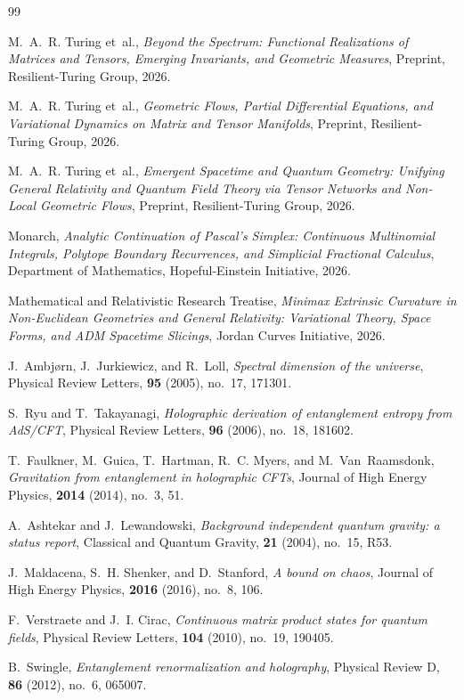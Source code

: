 \documentclass[11pt,a4paper,reqno]{amsart}
\theoremstyle{definition}
\numberwithin{equation}{section}
\begin{document}
\begin{thebibliography}{99}

M.~A.~R. Turing et~al.,
\emph{Beyond the Spectrum: Functional Realizations of Matrices and Tensors, Emerging Invariants, and Geometric Measures},
Preprint, Resilient-Turing Group, 2026.

M.~A.~R. Turing et~al.,
\emph{Geometric Flows, Partial Differential Equations, and Variational Dynamics on Matrix and Tensor Manifolds},
Preprint, Resilient-Turing Group, 2026.

M.~A.~R. Turing et~al.,
\emph{Emergent Spacetime and Quantum Geometry: Unifying General Relativity and Quantum Field Theory via Tensor Networks and Non-Local Geometric Flows},
Preprint, Resilient-Turing Group, 2026.

Monarch,
\emph{Analytic Continuation of Pascal's Simplex: Continuous Multinomial Integrals, Polytope Boundary Recurrences, and Simplicial Fractional Calculus},
Department of Mathematics, Hopeful-Einstein Initiative, 2026.

Mathematical and Relativistic Research Treatise,
\emph{Minimax Extrinsic Curvature in Non-Euclidean Geometries and General Relativity: Variational Theory, Space Forms, and ADM Spacetime Slicings},
Jordan Curves Initiative, 2026.

J.~Ambj{\o}rn, J.~Jurkiewicz, and R.~Loll,
\emph{Spectral dimension of the universe},
Physical Review Letters, \textbf{95} (2005), no.~17, 171301.

S.~Ryu and T.~Takayanagi,
\emph{Holographic derivation of entanglement entropy from AdS/CFT},
Physical Review Letters, \textbf{96} (2006), no.~18, 181602.

T.~Faulkner, M.~Guica, T.~Hartman, R.~C. Myers, and M.~Van~Raamsdonk,
\emph{Gravitation from entanglement in holographic CFTs},
Journal of High Energy Physics, \textbf{2014} (2014), no.~3, 51.

A.~Ashtekar and J.~Lewandowski,
\emph{Background independent quantum gravity: a status report},
Classical and Quantum Gravity, \textbf{21} (2004), no.~15, R53.

J.~Maldacena, S.~H. Shenker, and D.~Stanford,
\emph{A bound on chaos},
Journal of High Energy Physics, \textbf{2016} (2016), no.~8, 106.

F.~Verstraete and J.~I. Cirac,
\emph{Continuous matrix product states for quantum fields},
Physical Review Letters, \textbf{104} (2010), no.~19, 190405.

B.~Swingle,
\emph{Entanglement renormalization and holography},
Physical Review D, \textbf{86} (2012), no.~6, 065007.

\end{thebibliography}
\end{document}
